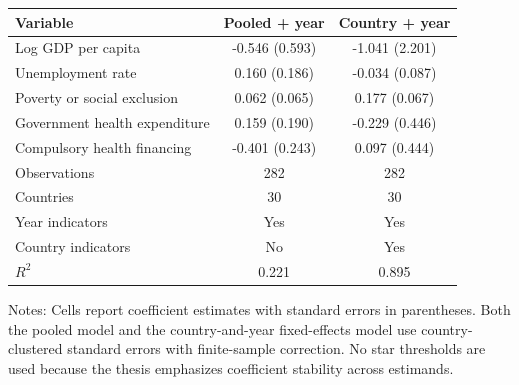 \begin{tabular}{lcc}
\toprule
Variable & Pooled + year & Country + year \\
\midrule
Log GDP per capita & -0.546 (0.593) & -1.041 (2.201) \\
Unemployment rate & 0.160 (0.186) & -0.034 (0.087) \\
Poverty or social exclusion & 0.062 (0.065) & 0.177 (0.067) \\
Government health expenditure & 0.159 (0.190) & -0.229 (0.446) \\
Compulsory health financing & -0.401 (0.243) & 0.097 (0.444) \\
\midrule
Observations & 282 & 282 \\
Countries & 30 & 30 \\
Year indicators & Yes & Yes \\
Country indicators & No & Yes \\
$R^2$ & 0.221 & 0.895 \\
\bottomrule
\end{tabular}

\vspace{0.2em}
\begin{minipage}{0.92\textwidth}
\scriptsize Notes: Cells report coefficient estimates with standard errors in parentheses. Both the pooled model and the country-and-year fixed-effects model use country-clustered standard errors with finite-sample correction. No star thresholds are used because the thesis emphasizes coefficient stability across estimands.
\end{minipage}
